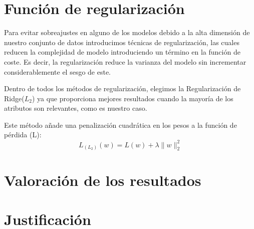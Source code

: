\documentclass[size=a4, parskip=half, titlepage=false, toc=flat, toc=bib, 12pt]{scrartcl}
\begin{document}
\section{Función de regularización}
Para evitar sobreajustes en alguno de los modelos debido a la alta dimensión de nuestro conjunto de datos introducimos técnicas de regularización, las cuales reducen la complejidad de modelo introduciendo un término en la función de coste. Es decir, la regularización reduce la varianza del modelo sin incrementar considerablemente el sesgo de este.

Dentro de todos los métodos de regularización, elegimos la Regularización de Ridge($L_2$) ya que proporciona mejores resultados cuando la mayoría de los atributos son relevantes, como es nuestro caso.

Este método añade una penalización cuadrática en los pesos a la función de pérdida (L):
$$L_{(L_2)}(w) = L(w) + \lambda \|w\|_2^2 $$

\section{Valoración de los resultados}
\section{Justificación}

\end{document}
